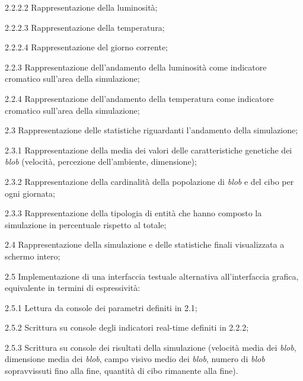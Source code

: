 \begin{myEnumerate}
\begin{myEnumerate}[label*=\arabic*.]
\begin{myEnumerate}[label*=\arabic*.]
\begin{myEnumerate}[label*=\arabic*.]
		        \item[2.2.2.2] Rappresentazione della luminosità;
	    	    \item[2.2.2.3] Rappresentazione della temperatura;
                \item[2.2.2.4] Rappresentazione del giorno corrente;
            \end{myEnumerate}
	    \item[2.2.3] Rappresentazione dell'andamento della luminosità come indicatore cromatico sull'area della simulazione;
	    \item[2.2.4] Rappresentazione dell'andamento della temperatura come indicatore cromatico sull'area della simulazione;
        \end{myEnumerate}
	\item[2.3] Rappresentazione delle statistiche riguardanti l'andamento della simulazione;
	\begin{myEnumerate}[label*=\arabic*.]
		    \item[2.3.1] Rappresentazione della media dei valori delle caratteristiche genetiche dei \textit{blob} (velocità, percezione dell'ambiente, dimensione);
		    \item[2.3.2] Rappresentazione della cardinalità della popolazione di \textit{blob} e del cibo per ogni giornata;
		    \item[2.3.3] Rappresentazione della tipologia di entità che hanno composto la simulazione in percentuale rispetto al totale;
	    \end{myEnumerate}
	    \item[2.4] Rappresentazione della simulazione e delle statistiche finali visualizzata a schermo intero;
	    \item[2.5] Implementazione di una interfaccia testuale alternativa all'interfaccia grafica, equivalente in termini di espressività:
	    \begin{myEnumerate}
		\item[2.5.1] Lettura da console dei parametri definiti in 2.1;
		\item[2.5.2] Scrittura su console degli indicatori real-time definiti in 2.2.2;
		\item[2.5.3] Scrittura su console dei risultati della simulazione (velocità media dei \textit{blob}, dimensione media dei \textit{blob}, campo visivo medio dei \textit{blob}, numero di \textit{blob} sopravvissuti fino alla fine, quantità di cibo rimanente alla fine).
	    \end{myEnumerate}
	\end{myEnumerate}
\end{myEnumerate}

